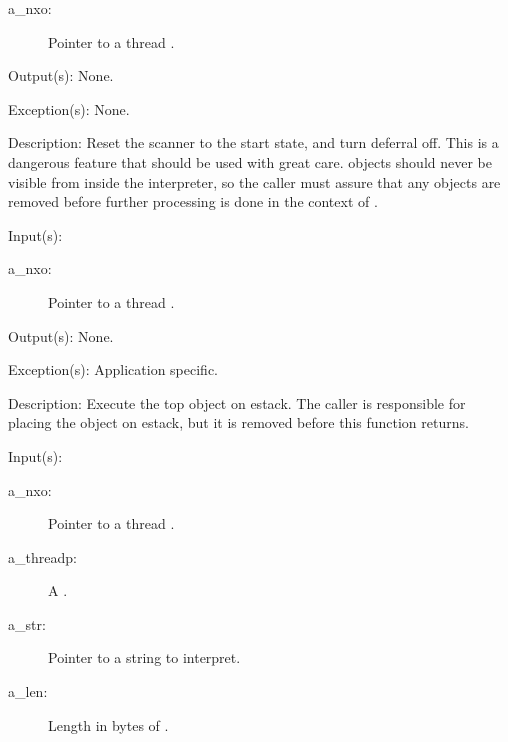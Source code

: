 \begin{capi}
\begin{capilist}
\begin{description}
		\item[a\_nxo: ]
			Pointer to a thread .
		\end{description}
	\item[Output(s): ] None.
	\item[Exception(s): ] None.
	\item[Description: ]
		Reset the scanner to the start state, and turn deferral off.
		This is a dangerous feature that should be used with great
		care.   objects should never be visible from
		inside the interpreter, so the caller must assure that any
		 objects are removed before further
		processing is done in the context of .
	\end{capilist}
\label{nxo_thread_loop}
	\begin{capilist}
	\item[Input(s): ]
		\begin{description}\item[]
		\item[a\_nxo: ]
			Pointer to a thread .
		\end{description}
	\item[Output(s): ] None.
	\item[Exception(s): ] Application specific.
	\item[Description: ]
		Execute the top object on estack.  The caller is responsible
		for placing the object on estack, but it is removed before this
		function returns.
	\end{capilist}
\label{nxo_thread_interpret}
	\begin{capilist}
	\item[Input(s): ]
		\begin{description}\item[]
		\item[a\_nxo: ]
			Pointer to a thread \classname{nxo}.
		\item[a\_threadp: ]
			A \classname{threadp}.
		\item[a\_str: ]
			Pointer to a string to interpret.
		\item[a\_len: ]
			Length in bytes of \cvar{a\_str}.
		\end{description}

\end{capilist}
\end{capi}
